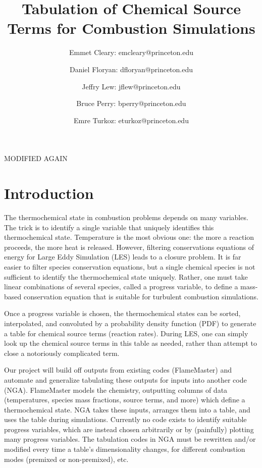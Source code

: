 \documentclass[11pt]{article}
\begin{document}
\title{\textbf{Tabulation of Chemical Source Terms for Combustion Simulations}}
\author{Emmet Cleary: emcleary@princeton.edu \and Daniel Floryan: dfloryan@princeton.edu \and Jeffry Lew: jflew@princeton.edu \and Bruce Perry: bperry@princeton.edu \and Emre Turkoz: eturkoz@princeton.edu}
\date{ } 
\maketitle

MODIFIED AGAIN
\section{Introduction}

The thermochemical state in combustion problems depends on many variables. The trick is to identify a single variable that uniquely identifies this thermochemical state. Temperature is the most obvious one: the more a reaction proceeds, the more heat is released. However, filtering conservations equations of energy for Large Eddy Simulation (LES) leads to a closure problem. It is far easier to filter species conservation equations, but a single chemical species is not sufficient to identify the thermochemical state uniquely. Rather, one must take linear combinations of several species, called a progress variable, to define a mass-based conservation equation that is suitable for turbulent combustion simulations.

Once a progress variable is chosen, the thermochemical states can be sorted, interpolated, and convoluted by a probability density function (PDF) to generate a table for chemical source terms (reaction rates). During LES, one can simply look up the chemical source terms in this table as needed, rather than attempt to close a notoriously complicated term.

Our project will build off outputs from existing codes (FlameMaster) and automate and generalize tabulating these outputs for inputs into another code (NGA). FlameMaster models the chemistry, outputting columns of data (temperatures, species mass fractions, source terms, and more) which define a thermochemical state. NGA takes these inputs, arranges them into a table, and uses the table during simulations. Currently no code exists to identify suitable progress variables, which are instead chosen arbitrarily or by (painfully) plotting many progress variables. The tabulation codes in NGA must be rewritten and/or modified every time a table's dimensionality changes, for different combustion modes (premixed or non-premixed), etc.
\end{document}

